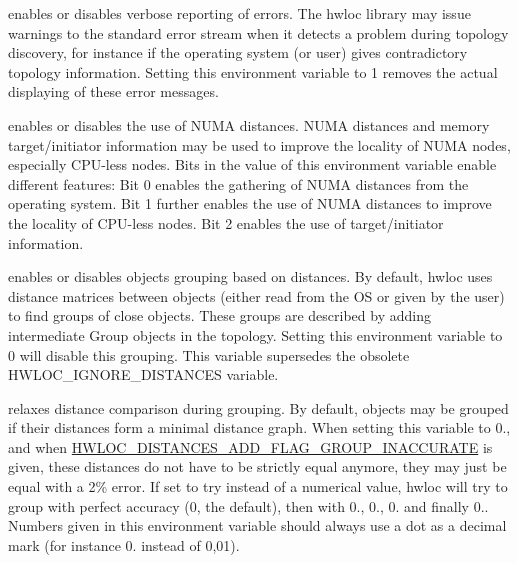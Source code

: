 \begin{DoxyDescription}
\item[H\+W\+L\+O\+C\+\_\+\+H\+I\+D\+E\+\_\+\+E\+R\+R\+O\+RS=0 ]enables or disables verbose reporting of errors. The hwloc library may issue warnings to the standard error stream when it detects a problem during topology discovery, for instance if the operating system (or user) gives contradictory topology information. Setting this environment variable to 1 removes the actual displaying of these error messages. 


\item[H\+W\+L\+O\+C\+\_\+\+U\+S\+E\+\_\+\+N\+U\+M\+A\+\_\+\+D\+I\+S\+T\+A\+N\+C\+ES=7 ]enables or disables the use of N\+U\+MA distances. N\+U\+MA distances and memory target/initiator information may be used to improve the locality of N\+U\+MA nodes, especially C\+P\+U-\/less nodes. Bits in the value of this environment variable enable different features\+: Bit 0 enables the gathering of N\+U\+MA distances from the operating system. Bit 1 further enables the use of N\+U\+MA distances to improve the locality of C\+P\+U-\/less nodes. Bit 2 enables the use of target/initiator information. 


\item[H\+W\+L\+O\+C\+\_\+\+G\+R\+O\+U\+P\+I\+NG=1 ]enables or disables objects grouping based on distances. By default, hwloc uses distance matrices between objects (either read from the OS or given by the user) to find groups of close objects. These groups are described by adding intermediate Group objects in the topology. Setting this environment variable to 0 will disable this grouping. This variable supersedes the obsolete H\+W\+L\+O\+C\+\_\+\+I\+G\+N\+O\+R\+E\+\_\+\+D\+I\+S\+T\+A\+N\+C\+ES variable. 


\item[H\+W\+L\+O\+C\+\_\+\+G\+R\+O\+U\+P\+I\+N\+G\+\_\+\+A\+C\+C\+U\+R\+A\+CY=0.\+05 ]relaxes distance comparison during grouping. By default, objects may be grouped if their distances form a minimal distance graph. When setting this variable to 0., and when \hyperlink{a00210_gga22428b6bab271411e3834e6b4ca22e37a5233ccf631c3bc53dd5c3e7a5d5c9b77}{H\+W\+L\+O\+C\+\_\+\+D\+I\+S\+T\+A\+N\+C\+E\+S\+\_\+\+A\+D\+D\+\_\+\+F\+L\+A\+G\+\_\+\+G\+R\+O\+U\+P\+\_\+\+I\+N\+A\+C\+C\+U\+R\+A\+TE} is given, these distances do not have to be strictly equal anymore, they may just be equal with a 2\% error. If set to {\ttfamily try} instead of a numerical value, hwloc will try to group with perfect accuracy (0, the default), then with 0., 0., 0. and finally 0.. Numbers given in this environment variable should always use a dot as a decimal mark (for instance 0. instead of 0,01).



\end{DoxyDescription}
